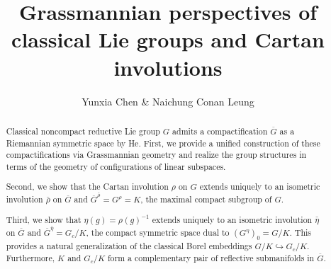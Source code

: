 \documentclass{article}
\begin{document}
\title{Grassmannian perspectives  of classical Lie groups and Cartan involutions}
\author{Yunxia Chen \& Naichung Conan Leung}
\date{}
\maketitle

\begin{abstract}
Classical noncompact reductive Lie group $G$ admits a compactification $\overline{G}$ as a Riemannian symmetric space by He. First, we provide a unified construction of these compactifications via Grassmannian geometry and realize the group structures in terms of the geometry of configurations of linear subspaces.

Second, we show that the Cartan involution $\rho$ on $G$  extends uniquely to an isometric involution $\bar{\rho}$ on $\overline{G}$ and $\overline{G}^{\bar{\rho}} = G^{\rho} = K$, the maximal compact subgroup of $G$.

Third, we show that $\eta(g) = \rho(g)^{-1}$  extends uniquely to an isometric involution $\bar{\eta}$ on $\overline{G}$ and $\overline{G}^{\bar{\eta}} = G_c/K$, the compact symmetric space dual to $(G^\eta)_0 = G/K$. This provides a natural generalization of the classical Borel embeddings $G/K \hookrightarrow G_c/K$. Furthermore, $K$ and $G_c/K$ form a complementary  pair of reflective submanifolds in $\overline{G}$.
\end{abstract}
\end{document}
